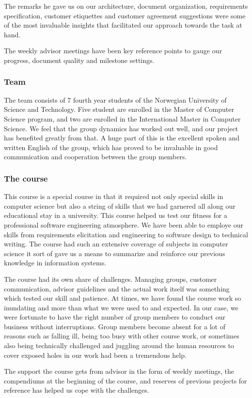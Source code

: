 The remarks he gave us on our architecture, document organization, requirements specification, customer etiquettes and customer agreement suggestions were some of the most invaluable insights that facilitated our approach towards the task at hand.

The weekly advisor meetings have been key reference points to gauge our progress, document quality and milestone settings.
	\subsubsection{Team}
  The team consists of 7 fourth year students of the Norwegian University of Science and Technology. Five student are enrolled in the Master of Computer Science program, and two are enrolled in the International Master in Computer Science. We feel that the group dynamics has worked out well, and our project has benefited greatly from that. A huge part of this is the excellent spoken and written English of the group, which has proved to be invaluable in good communication and cooperation between the group members.
    \subsubsection{The course}

   This course is a special course in that it required not only special skills in computer science but also a string of skills that we had garnered all along our educational stay in a university. This course helped us test our fitness for a professional software engineering atmosphere. We have been able to employe our skills from requirements elicitation and engineering to software design to technical writing. The course had such an extensive coverage of subjects in computer science it sort of gave us a means to summarize and reinforce our previous knowledge in information systems.

   The course had its own share of challenges. Managing groups, customer communication, advisor guidelines and the actual work itself was something which tested our skill and patience. At times, we have found the course work so inundating and more than what we were used to and expected. In our case, we were fortunate to have the right number of group members to conduct our business without interruptions. Group members become absent for a lot of reasons such as falling ill, being too busy with other course work, or sometimes also being technically challenged and juggling around the human resources to cover exposed holes in our work had been a tremendous help.

   The support the course gets from advisor in the form of weekly meetings, the compendiums at the beginning of the course, and reserves of previous projects for reference has helped us cope with the challenges. 